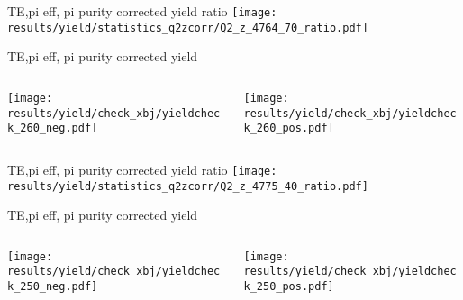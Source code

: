 \begin{frame}{TE,pi eff, pi purity corrected yield ratio}
\texttt{[image: results/yield/statistics\_q2zcorr/Q2\_z\_4764\_70\_ratio.pdf]}
\end{frame}
\begin{frame}{TE,pi eff, pi purity corrected yield}
\begin{columns}
\begin{column}[T]{0.5\textwidth}
\texttt{[image: results/yield/check\_xbj/yieldcheck\_260\_neg.pdf]}
\end{column}
\begin{column}[T]{0.5\textwidth}
\texttt{[image: results/yield/check\_xbj/yieldcheck\_260\_pos.pdf]}
\end{column}
\end{columns}
\end{frame}
\begin{frame}{TE,pi eff, pi purity corrected yield ratio}
\texttt{[image: results/yield/statistics\_q2zcorr/Q2\_z\_4775\_40\_ratio.pdf]}
\end{frame}
\begin{frame}{TE,pi eff, pi purity corrected yield}
\begin{columns}
\begin{column}[T]{0.5\textwidth}
\texttt{[image: results/yield/check\_xbj/yieldcheck\_250\_neg.pdf]}
\end{column}
\begin{column}[T]{0.5\textwidth}
\texttt{[image: results/yield/check\_xbj/yieldcheck\_250\_pos.pdf]}
\end{column}
\end{columns}
\end{frame}
